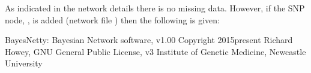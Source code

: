 \documentclass[letterpaper,10pt,english]{sphinxmanual}
\begin{document}
\sphinxAtStartPar
As indicated in the network details there is no missing data. However, if the SNP node, , is added (network file ) then the following is given:

\begin{sphinxVerbatim}[commandchars=\\\{\}]
BayesNetty: Bayesian Network software, v1.00
\PYGZhy{}\PYGZhy{}\PYGZhy{}\PYGZhy{}\PYGZhy{}\PYGZhy{}\PYGZhy{}\PYGZhy{}\PYGZhy{}\PYGZhy{}\PYGZhy{}\PYGZhy{}\PYGZhy{}\PYGZhy{}\PYGZhy{}\PYGZhy{}\PYGZhy{}\PYGZhy{}\PYGZhy{}\PYGZhy{}\PYGZhy{}\PYGZhy{}\PYGZhy{}\PYGZhy{}\PYGZhy{}\PYGZhy{}\PYGZhy{}\PYGZhy{}\PYGZhy{}\PYGZhy{}\PYGZhy{}\PYGZhy{}\PYGZhy{}\PYGZhy{}\PYGZhy{}\PYGZhy{}\PYGZhy{}\PYGZhy{}\PYGZhy{}\PYGZhy{}\PYGZhy{}\PYGZhy{}\PYGZhy{}\PYGZhy{}\PYGZhy{}\PYGZhy{}\PYGZhy{}\PYGZhy{}\PYGZhy{}\PYGZhy{}
Copyright 2015\PYGZhy{}present Richard Howey, GNU General Public License, v3
Institute of Genetic Medicine, Newcastle University


\end{sphinxVerbatim}
\end{document}
